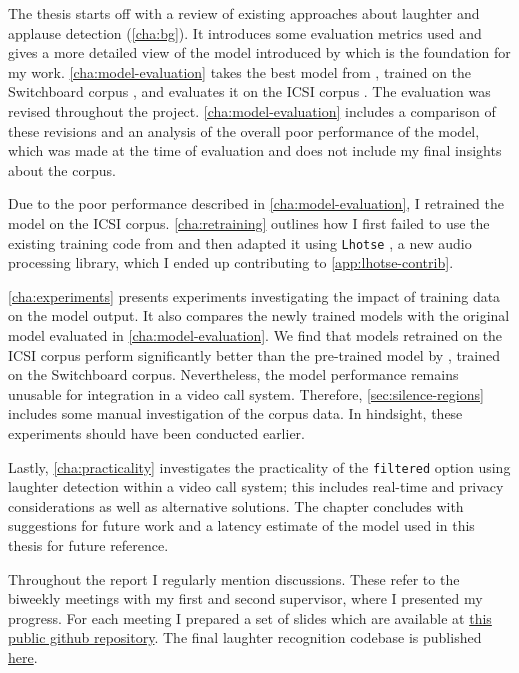 \documentclass[bsc,frontabs,parskip,deptreport]{infthesis}
\begin{document}
The thesis starts off with a review of existing approaches about laughter and applause detection (\autoref{cha:bg}). It introduces some evaluation metrics used and gives a more detailed view of the model introduced by \citet{gillick2021robust} which is the foundation for my work. \autoref{cha:model-evaluation} takes the best model from \citet{gillick2021robust}, trained on the Switchboard corpus \citep{switchboard-corpus}, and evaluates it on the ICSI corpus \citep{morgan2001meeting}. The evaluation was revised throughout the project. \autoref{cha:model-evaluation} includes a comparison of these revisions and an analysis of the overall poor performance of the model, which was made at the time of evaluation and does not include my final insights about the corpus.

Due to the poor performance described in \autoref{cha:model-evaluation}, I retrained the model on the ICSI corpus. \autoref{cha:retraining} outlines how I first failed to use the existing training code from \citet{gillick2021robust} and then adapted it using \texttt{Lhotse} \citep{zelasko2021lhotse}, a new audio processing library, which I ended up contributing to \autoref{app:lhotse-contrib}.

\autoref{cha:experiments} presents experiments investigating the impact of training data on the model output. It also compares the newly trained models with the original model evaluated in \autoref{cha:model-evaluation}. We find that models retrained on the ICSI corpus perform significantly better than the pre-trained model by \citet{gillick2021robust}, trained on the Switchboard corpus. Nevertheless, the model performance remains unusable for integration in a video call system. Therefore, \autoref{sec:silence-regions} includes some manual investigation of the corpus data. In hindsight, these experiments should have been conducted earlier. 

Lastly, \autoref{cha:practicality} investigates the practicality of the \texttt{filtered} option using laughter detection within a video call system; this includes real-time and privacy considerations as well as alternative solutions. The chapter concludes with suggestions for future work and a latency estimate of the model used in this thesis for future reference. 

Throughout the report I regularly mention discussions. These refer to the biweekly meetings with my first and second supervisor, where I presented my progress. For each meeting I prepared a set of slides which are available at \href{https://github.com/LasseWolter/honours-project-21-22/tree/main/Meeting_Notes}{this public github repository}.
The final laughter recognition codebase is published \href{https://github.com/LasseWolter/laughter-detection-icsi}{here}.
\end{document}

